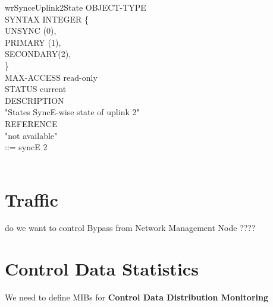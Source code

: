 wrSynceUplink2State OBJECT-TYPE \\
SYNTAX INTEGER \{ \\
\tab UNSYNC (0), \\
\tab PRIMARY (1), \\
\tab SECONDARY(2), \\
\} \\
MAX-ACCESS read-only \\
STATUS current \\
DESCRIPTION \\
"States SyncE-wise state of uplink 2"  \\
REFERENCE \\
"not available" \\
::= { syncE 2 } \\
\\

\section{\HP Traffic}

do we want to control \HP Bypass from Network Management Node ????

\section{Control Data Statistics}


We need to define MIBs for \textbf{Control Data Distribution Monitoring}
